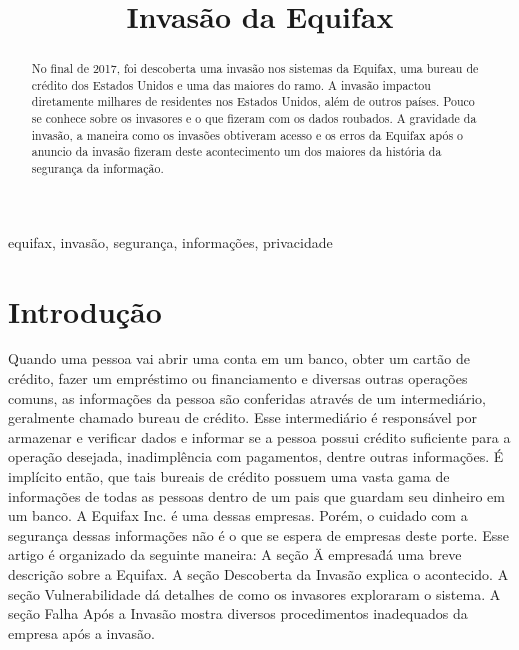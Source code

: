 \documentclass[conference]{IEEEtran}
\begin{document}
\title{Invasão da Equifax}

\author{
}

\maketitle

\begin{abstract}
No final de 2017, foi descoberta uma invasão nos sistemas da Equifax, uma bureau de crédito dos Estados Unidos e uma das maiores do ramo. A invasão impactou diretamente milhares de residentes nos
Estados Unidos, além de outros países. Pouco se conhece sobre os invasores e o que fizeram com os dados roubados. A gravidade da invasão, a maneira como os invasões obtiveram acesso e os erros da Equifax
após o anuncio da invasão fizeram deste acontecimento um dos maiores da história da segurança da informação.
\end{abstract}

\begin{IEEEkeywords}
equifax, invasão, segurança, informações, privacidade
\end{IEEEkeywords}

\section{Introdução}
Quando uma pessoa vai abrir uma conta em um banco, obter um cartão de crédito, fazer um empréstimo ou financiamento e diversas outras operações comuns, as informações da pessoa são conferidas através de um
intermediário, geralmente chamado bureau de crédito. Esse intermediário é responsável por armazenar e verificar dados e informar se a pessoa possui crédito suficiente para a operação desejada, inadimplência com pagamentos, dentre outras informações.
É implícito então, que tais bureais de crédito possuem uma vasta gama de informações de todas as pessoas dentro de um pais que guardam seu dinheiro em um banco.
A Equifax Inc. é uma dessas empresas. Porém, o cuidado com a segurança dessas informações não é o que se espera de empresas deste porte.
Esse artigo é organizado da seguinte maneira: A seção \"A empresa\" dá uma breve descrição sobre a Equifax. A seção Descoberta da Invasão explica o acontecido. 
A seção Vulnerabilidade dá detalhes de como os invasores exploraram o sistema. A seção Falha Após a Invasão mostra diversos procedimentos inadequados da empresa após a invasão.
\end{document}
